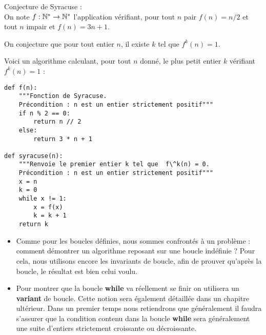 

\label{ex-syracuse} Conjecture de Syracuse :\\
On note $f : \mathbb{N}^{*} \to \mathbb{N}^{*}$ l'application vérifiant, pour tout $n$ pair
$f(n)=n/2$ et tout $n$ impair et $f(n)=3n+1$.

On conjecture que pour tout entier $n$, il existe $k$ tel que
$f^{k}(n)=1$.

Voici un algorithme calculant, pour tout $n$ donné, le plus petit
entier $k$ vérifiant $f^{k}(n) = 1$ :

\begin{lstlisting}
def f(n):
    """Fonction de Syracuse.
    Précondition : n est un entier strictement positif"""
    if n % 2 == 0:
        return n // 2
    else:
        return 3 * n + 1
        
def syracuse(n):
    """Renvoie le premier entier k tel que  f\^k(n) = 0.
    Précondition : n est un entier strictement positif"""
    x = n
    k = 0
    while x != 1:
        x = f(x)
        k = k + 1
    return k
\end{lstlisting}



\begin{rem}
\begin{itemize}
\item Comme pour les boucles définies, nous sommes confrontés à un problème : comment démontrer un 
algorithme reposant sur une boucle indéfinie ? Pour cela, nous utilisons encore les invariants de 
boucle, afin de prouver qu'après la boucle, le résultat est bien celui voulu.
\item Pour montrer que la boucle \textbf{while} va réellement se finir on utilisera un \textbf{variant} de boucle. Cette notion sera également détaillée dans un chapitre ultérieur. Dans un premier temps nous retiendrons que généralement il faudra s'assurer que la condition contenu dans la boucle \textbf{while} sera généralement une suite d'entiers strictement croissante ou décroissante.
\end{itemize}
\end{rem}



